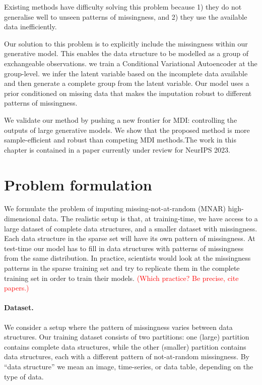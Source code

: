 \documentclass[a4paper,12pt,twoside,openright]{report}
\newcommand{\crit}[1]{\textcolor{red}{#1}}
\begin{document}
Existing methods have difficulty solving this problem because 1) they do not generalise well to unseen patterns of missingness, and 2) they use the available data inefficiently.

Our solution to this problem is to explicitly include the missingness within our generative model. This enables the data structure to be modelled as a group of exchangeable observations. we train a Conditional Variational Autoencoder at the group-level. we infer the latent variable based on the incomplete data available and then generate a complete group from the latent variable. Our model uses a prior conditioned on missing data that makes the imputation robust to different patterns of missingness.

We validate our method by pushing a new frontier for MDI: controlling the outputs of large generative models. We show that the proposed method is more sample-efficient and robust than competing MDI methods.The work in this chapter is contained in a paper currently under review for NeurIPS 2023.

\section{Problem formulation}

We formulate the problem of imputing missing-not-at-random (MNAR) high-dimensional data. The realistic setup is that, at training-time, we have access to a large dataset of complete data structures, and a smaller dataset with missingness. Each data structure in the sparse set will have its own pattern of missingness. At test-time our model has to fill in data structures with patterns of missingness from the same distribution. In practice, scientists would look at the missingness patterns in the sparse training set and try to replicate them in the complete training set in order to train their models. \crit{(Which practice? Be precise, cite papers.)}

\paragraph{Dataset.} We consider a setup where the pattern of missingness varies between data structures. Our training dataset consists of two partitions: one (large) partition contains complete data structures, while the other (smaller) partition contains data structures, each with a different pattern of not-at-random missingness. By ``data structure'' we mean an image, time-series, or data table, depending on the type of data.
\end{document}
